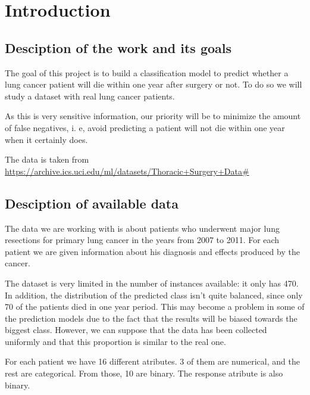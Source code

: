 \section{Introduction}

\subsection{Desciption of the work and its goals}

The goal of this project is to build a classification model to predict whether
a lung cancer patient will die within one year after surgery or not. To do so
we will study a dataset with real lung cancer patients.

As this is very sensitive information, our priority will be to minimize the
amount of false negatives, i. e, avoid predicting a patient will not die within
one year when it certainly does.


The data is taken from
\url{https://archive.ics.uci.edu/ml/datasets/Thoracic+Surgery+Data#}
\cite{zieba2013boosted}

\subsection{Desciption of available data}

The data we are working with is about patients who underwent major lung
resections for primary lung cancer in the years from 2007 to 2011. For each
patient we are given information about his diagnosis and effects produced
by the cancer.

The dataset is very limited in the number of instances available: it only has
470. In addition, the distribution of the predicted class isn't quite balanced,
since only 70 of the patients died in one year period. This may become a problem
in some of the prediction models due to the fact that the results will be biased
towards the biggest class. However, we can suppose that the data has been
collected uniformly and that this proportion is similar to the real one.

For each patient we have 16 different atributes. 3 of them are numerical, and
the rest are categorical. From those, 10 are binary. The response atribute is
also binary.
